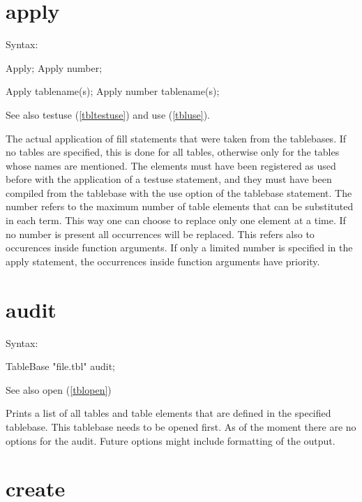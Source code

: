 
\section{apply}
\label{tblapply}

\noindent Syntax:

Apply;
Apply number;

Apply tablename(s);
Apply number tablename(s);

\noindent See also testuse (\ref{tbltestuse}) and use (\ref{tbluse}).

\noindent The actual application of fill 
statements that were taken from the tablebases. If no tables are specified, 
this is done for all tables, otherwise only for the tables whose names are 
mentioned. The elements must have been registered as used before with the 
application of a testuse statement, and they must have been 
compiled from the tablebase with the use option of the tablebase 
statement. The number refers to the maximum number of table elements that 
can be substituted in each term. This way one can choose to replace only 
one element at a time. If no number is present all occurrences will be 
replaced. This refers also to occurences inside function arguments. If only 
a limited number is specified in the apply statement, the occurrences 
inside function arguments have priority.


\section{audit}
\label{tblaudit}

\noindent Syntax:

TableBase "file.tbl" audit;

\noindent See also open (\ref{tblopen})

\noindent Prints a list of all tables and table elements that 
are defined in the specified tablebase. This tablebase needs to be opened 
first. As of the moment there are no options for the audit. Future options 
might include formatting of the output.


\section{create}
\label{tblcreate}

